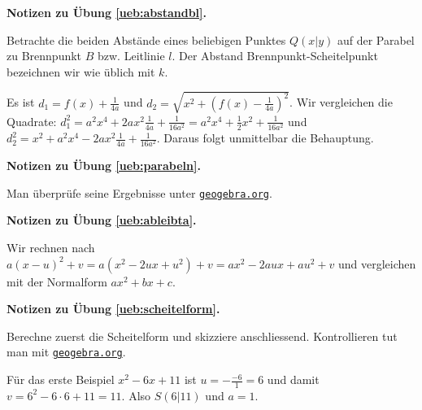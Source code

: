 \documentclass[%
11pt,%
twoside,%
titlepage,%
swissgerman,%
headsepline%
]{scrartcl}
\newcommand{\faReturnGray}{\textcolor{gray}{\faMailReply}} %
\newcommand{\geogebralink}{\href{https://www.geogebra.org/calculator}{\texttt{geogebra.org}}}
\theoremstyle{definition}
\theoremstyle{plain}
\newcommand{\concatueb}[1]{ueb:#1}%
\newcommand{\concatlsg}[1]{lsg:#1}%
\newenvironment{lsg}[1]{%
    \par\noindent\textbf{Notizen zu Übung \ref{\concatueb{#1}}.}%
    \label{\concatlsg{#1}} %
    \hfill\hyperref[\concatueb{#1}]{\faReturnGray}\par %
}{%
    \par%
}
\begin{document}
\begin{lsg}{abstandbl}
    Betrachte die beiden Abstände eines beliebigen Punktes $Q(x|y)$ auf der Parabel zu Brennpunkt $B$ bzw. Leitlinie $l$. Der Abstand Brennpunkt-Scheitelpunkt bezeichnen wir wie üblich mit $k$.

\begin{center}
\end{center}

Es ist
$d_1=f(x)+\frac{1}{4a}$ und $d_2=\sqrt{x^2+(f(x)-\frac{1}{4a})^2}$. Wir vergleichen die Quadrate:
$d_1^2=a^2x^4+2ax^2\frac{1}{4a}+\frac{1}{16a^2}=a^2x^4+\frac{1}{2}x^2+\frac{1}{16a^2}$
und
$d_2^2=x^2+a^2x^4-2ax^2\frac{1}{4a}+\frac{1}{16a^2}$. Daraus folgt unmittelbar die Behauptung.
\end{lsg}
\begin{lsg}{parabeln}
    Man überprüfe seine Ergebnisse unter \geogebralink.
\end{lsg}
\begin{lsg}{ableibta}
    Wir rechnen nach $a(x-u)^2+v=a(x^2-2ux+u^2)+v=ax^2-2aux+au^2+v$ und vergleichen mit der Normalform $ax^2+bx+c$.
\end{lsg}
\begin{lsg}{scheitelform}
    Berechne zuerst die Scheitelform und skizziere anschliessend. Kontrollieren tut man mit \geogebralink.
    
    Für das erste Beispiel $x^2-6x+11$ ist $u=-\frac{-6}{1}=6$ und damit $v=6^2-6\cdot6+11=11$. Also $S(6|11)$ und $a=1$.
\end{lsg}
\end{document}
